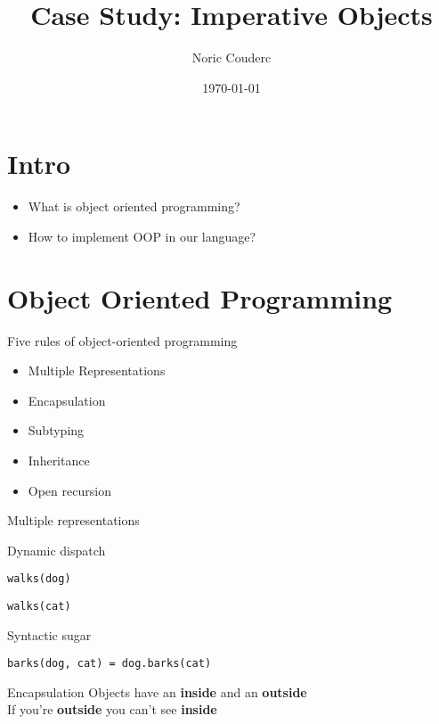 \documentclass[presentation]{beamer}
\author{Noric Couderc}
\date{\today}
\title{Case Study: Imperative Objects}
\begin{document}
\maketitle

\section{Intro}
\begin{frame}
  \begin{itemize}
  \item What is object oriented programming?
  \item How to implement OOP in our language?
  \end{itemize}
\end{frame}

\section{Object Oriented Programming}


\begin{frame}{Five rules of object-oriented programming}
\begin{itemize}
\item Multiple Representations
\item Encapsulation
\item Subtyping
\item Inheritance
\item Open recursion
\end{itemize}
\end{frame}

\begin{frame}[fragile]{Multiple representations}
\begin{block}{Dynamic dispatch}
\begin{verbatim}
walks(dog)
\end{verbatim}
\begin{verbatim}
walks(cat)
\end{verbatim}
\end{block}

\begin{block}{Syntactic sugar}
\begin{verbatim}
barks(dog, cat) = dog.barks(cat)
\end{verbatim}
\end{block}
\end{frame}

\begin{frame}{Encapsulation}
  \centering
  Objects have an \textbf{inside} and an \textbf{outside}\\
  If you're \textbf{outside} you can't see \textbf{inside}
\end{frame}
\end{document}
